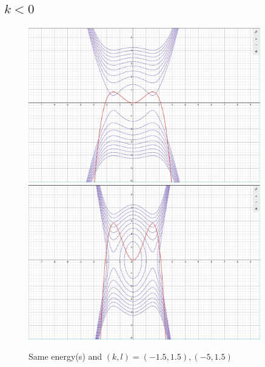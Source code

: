 \documentclass[12pt,letter]{article}
\begin{document}
{\subsection*{$k<0$ }
\begin{figure}[H]
	\centering
	\includegraphics[width=0.9\textwidth]{ss/dsmsN1.png}
	\includegraphics[width=0.9\textwidth]{ss/dsmsN2.png}
	\caption{Same energy(s) and $(k,l) = (-1.5,1.5), (-5,1.5)$}
	\label{fig:ss-dsmsN2-png}
\end{figure}



}
\end{document}
